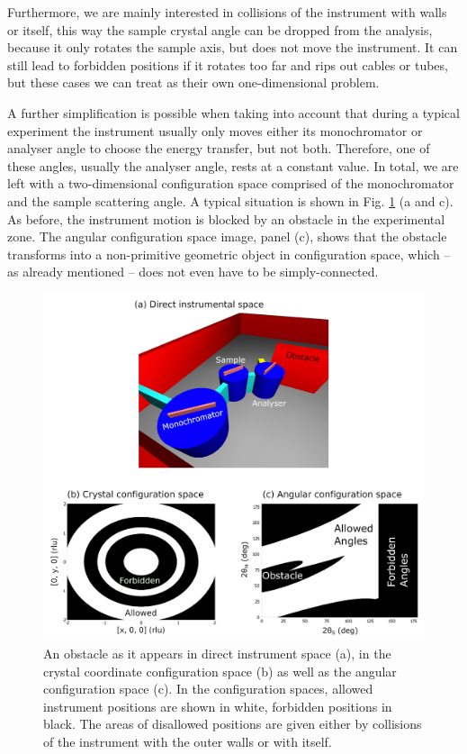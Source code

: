 Furthermore, we are mainly interested in collisions of the instrument with walls 
or itself, this way the sample crystal angle can be dropped from the analysis, 
because it only rotates the sample axis, but does not move the instrument. 
It can still lead to forbidden positions if it rotates too far and rips out cables 
or tubes, but these cases we can treat as their own one-dimensional problem. 

A further simplification is possible when taking into account that during a 
typical experiment the instrument usually only moves either its monochromator 
or analyser angle to choose the energy transfer, but not both. 
Therefore, one of these angles, usually the analyser angle, rests at a constant 
value. In total, we are left with a two-dimensional configuration space comprised 
of the monochromator and the sample scattering angle. 
A typical situation is shown in Fig. \ref{fig:tas_wall} (a and c). 
As before, the instrument motion is blocked by an obstacle in the experimental zone. 
The angular configuration space image, panel (c), shows that the obstacle 
transforms into a non-primitive geometric object in configuration space, 
which -- as already mentioned -- does not even have to be simply-connected.

\begin{figure}[htb]
	\centering
	\includegraphics[width = 0.95 \textwidth]{figures/tas_wall.jpg}
	\caption[TAS configuration spaces.]{
		An obstacle as it appears in direct instrument space (a), in the 
		crystal coordinate configuration space (b) as well as the angular
		configuration space (c).
		In the configuration spaces, allowed instrument positions are 
		shown in white, forbidden positions in black. 
		The areas of disallowed positions are given either by collisions 
		of the instrument with the outer walls or with itself.}
	\label{fig:tas_wall}
\end{figure}


